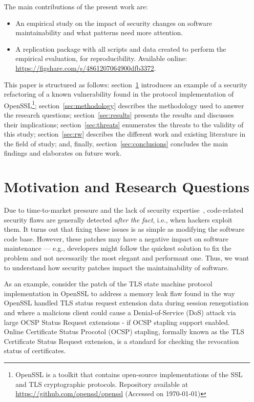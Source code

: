 \documentclass[10pt,conference]{IEEEtran}
\makeatletter
\newcommand\Sof[1]{\nb{Sofia}{red}{#1}}
\newcommand\footnoteref[1]{\protected@xdef\@thefnmark{\ref{#1}}\@footnotemark}
\makeatother
\begin{document}
The main contributions of the present work are:
%
\begin{itemize}
	\item An empirical study on the impact of security changes on software
	maintainability and what patterns need more attention.
	\item A replication package with all scripts and data created to perform the
	empirical evaluation, for reproducibility. Available online:
  \url{https://figshare.com/s/4861207064900dfb3372}.
\end{itemize}
This paper is structured as follows: section~\ref{sec:motivation} introduces an
example of a security refactoring of a known vulnerability found in the
protocol implementation of OpenSSL\footnote{\label{openssl}OpenSSL is a toolkit that
contains open-source implementations of the SSL and TLS cryptographic
protocols. Repository available at \url{https://github.com/openssl/openssl}
(Accessed on \today{})}; section~\ref{sec:methodology} describes the
methodology used to answer the research questions; section~\ref{sec:results}
presents the results and discusses their
implications; section~\ref{sec:threats} enumerates the threats to the validity of
this study; section~\ref{sec:rw} describes the different work and existing
literature in the field of study; and, finally, section~\ref{sec:conclusions}
concludes the main findings and elaborates on future work.
%

\section{Motivation and Research Questions}\label{sec:motivation}
%
Due to time-to-market pressure and the lack of security expertise~\cite{8077802}, code-related
security flaws are generally detected \textit{after the fact}, i.e., when
hackers exploit them. It turns out that fixing these issues is as simple as
modifying the software code base. However, these patches may have a
negative impact on software maintenance --- e.g., developers might follow the
quickest solution to fix the problem and not necessarily the most elegant and
performant one. Thus, we want to understand how security patches impact
the maintainability of software. 

\Sof{Waiting for final results --}As an example, consider the patch of the TLS state machine protocol implementation
in OpenSSL\footnoteref{openssl} to address a memory leak flaw found in the way 
OpenSSL handled TLS status request extension data during session 
renegotiation and where a malicious client could cause a Denial-of-Service
(DoS) attack via large OCSP Status Request extensions - if OCSP stapling support
enabled. Online Certificate Status Procotol (OCSP) stapling, formally known as the TLS Certificate 
Status Request extension, is a standard for checking the revocation status of
certificates. 
\end{document}

